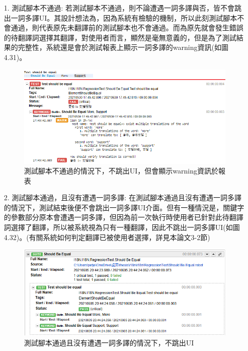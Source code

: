 \begin{itemize}
\item[1.]測試腳本不通過:
若測試腳本不通過，則不論遭遇一詞多譯與否，皆不會跳出一詞多譯UI。其設計想法為，因為系統有檢驗的機制，所以此刻測試腳本不會通過，則代表原先未翻譯前的測試腳本也不會通過。而為原先就會發生錯誤的待翻譯詞選擇其翻譯，對使用者而言，顯然是毫無意義的，但是為了測試結果的完整性，系統還是會於測試報表上顯示一詞多譯的warning資訊(如圖4.31)。
\begin{figure}[H]
\includegraphics[width= \textwidth]{../論文截圖/4-3-6 測試腳本fail，不跳UI.png}
\caption{測試腳本不通過的情況下，不跳出UI，但會顯示warning資訊於報表}
\end{figure}
\item[2.]測試腳本通過，且沒有遭遇一詞多譯: 
在測試腳本通過且沒有遭遇一詞多譯的情況下，測試結束後便不會跳出一詞多譯UI介面。但有一種情況是，關鍵字的參數部分原本會遭遇一詞多譯，但因為前一次執行時使用者已針對此待翻譯詞選擇了翻譯，所以被系統視為只有一種翻譯，因此不跳出一詞多譯UI(如圖4.32)。(有關系統如何判定翻譯已被使用者選擇，詳見本論文3-2節)
\begin{figure}[H]
\includegraphics[width= \textwidth]{../論文截圖/4-3-7 測試腳本pass且沒一詞多譯，不跳UI.png}
\caption{測試腳本通過且沒有遭遇一詞多譯的情況下，不跳出UI}
\end{figure}
\end{itemize}

